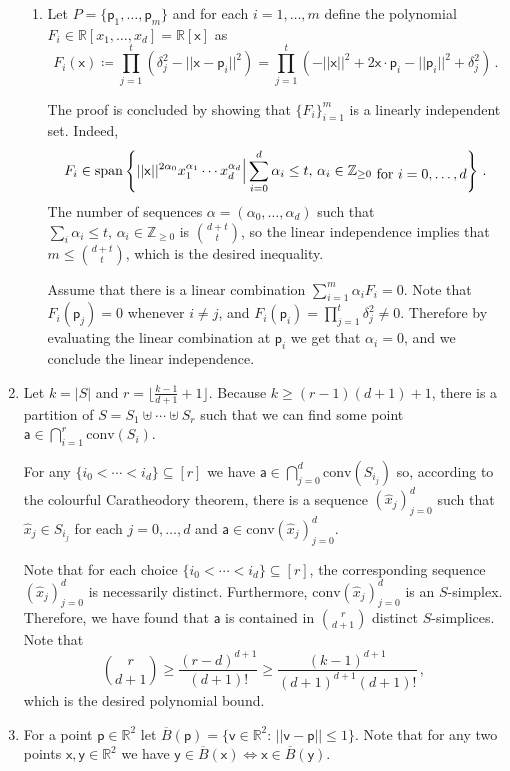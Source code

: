 \documentclass[kulak]{tplt}
\theoremstyle{definition}
\newcommand{\R}{\mathbb{R}}
\newcommand{\Z}{\mathbb{Z}}
\newcommand{\vv}{\mathsf{v}}
\newcommand{\vx}{\mathsf{x}}
\newcommand{\vy}{\mathsf{y}}
\newcommand{\va}{\mathsf{a}}
\newcommand{\vp}{\mathsf{p}}
\newcommand{\spn}{\mathrm{span}}
\newcommand{\conv}{\mathrm{conv}}
\begin{document}
\begin{enumerate}
\begin{enumerate}
\item 
Let $P = \{\vp_1, \ldots, \vp_m \} $ and for each $i=1, \ldots, m$ define the polynomial $F_i \in \R[x_1, \ldots, x_d] = \R[\vx]$ as
$$ F_i ( \vx ) \coloneqq \prod_{j=1}^t \left( \delta_j^2 - ||\vx - \vp_i ||^2\right)  =  \prod_{j=1}^t \left(  - ||\vx ||^2 + 2 \vx \cdot \vp_i - ||\vp_i||^2 + \delta_j^2\right) \, .$$


The proof is concluded by showing that $\{F_i\}_{i=1}^m$ is a linearly independent set.
Indeed, 
$$F_i \in \spn \left\{ ||\vx||^{2\alpha_0} x_1^{\alpha_1} \cdots x_d^{\alpha_d}\Big| \sum_{i=0}^d \alpha_i \leq t, \, \alpha_i\in \Z_{\geq 0 } \txt{ for $i = 0 , \ldots, d $ }\right\}\, . $$
The number of sequences $\alpha = (\alpha_0, \ldots, \alpha_d)$ such that $ \sum_i \alpha_i \leq t, \, \alpha_i\in \Z_{\geq 0 }$ is $\binom{d+t}{t}$, so the linear independence implies that $m \leq \binom{d+t}{t}$, which is the desired inequality.

Assume that there is a linear combination $ \sum_{i=1}^m \alpha_i F_i = 0 $.
Note that $F_i(\vp_j ) = 0$ whenever $i \neq j$, and $F_i(\vp_i ) = \prod_{j=1}^t \delta_j^2 \neq 0$.
Therefore by evaluating the linear combination at $\vp_i $ we get that $\alpha_i =0$, and we conclude the linear independence.
\end{enumerate}

\item 
Let $k = |S|$ and $r = \lfloor \frac{k-1}{d+1} + 1 \rfloor$.
Because $k \geq (r-1)(d+1) + 1$, there is a partition of $S = S_1 \uplus \cdots \uplus S_r$ such that we can find some point $\va \in \bigcap_{i=1}^r \conv (S_i)$.

For any $\{i_0 < \cdots < i_d\} \subseteq [r]$ we have $\va \in \bigcap_{j=0}^d \conv (S_{i_j})$ so, according to the colourful Caratheodory theorem, there is a sequence $(\hat{x}_j)_{j=0}^d$ such that $\hat{x}_j\in S_{i_j} $ for each $j = 0, \ldots, d$ and $\va \in \conv (\hat{x}_j)_{j=0}^d$.

Note that for each choice $\{i_0 < \cdots < i_d\} \subseteq [r]$, the corresponding sequence $(\hat{x}_j)_{j=0}^d$ is necessarily distinct.
Furthermore, $\conv (\hat{x}_j)_{j=0}^d $ is an $S$-simplex.
Therefore, we have found that $\va $ is contained in $\binom{r}{d+1}$ distinct $S$-simplices.
Note that 
$$\binom{r}{d+1} \geq \frac{(r-d)^{d+1}}{(d+1)!} \geq \frac{(k-1)^{d+1}}{(d+1)^{d+1} (d+1)!} \, ,$$
which is the desired polynomial bound.

\item 
For a point $\vp \in \R^2$ let $\overline{B}(\vp) = \{ \vv \in \R^2 : \, ||\vv - \vp|| \leq 1 \}$.
Note that for any two points $\vx, \vy \in \R^2$ we have $\vy \in \overline{B}(\vx) \Leftrightarrow \vx \in \overline{B}(\vy)$.


\end{enumerate}
\end{document}
